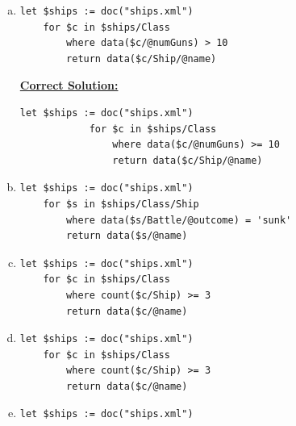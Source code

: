 \documentclass[12pt]{article}
\begin{document}
\begin{enumerate}[1.]
\begin{enumerate}[a)]
\begin{mdframed}
        \end{mdframed}

        \item

    \begin{lstlisting}[language=XML]
    let $ships := doc("ships.xml")
    for $c in $ships/Class
        where data($c/@numGuns) > 10
        return data($c/Ship/@name)
    \end{lstlisting}

        \begin{mdframed}
            \underline{\textbf{Correct Solution:}}

            \begin{lstlisting}[language=XML]
            let $ships := doc("ships.xml")
            for $c in $ships/Class
                where data($c/@numGuns) >= 10
                return data($c/Ship/@name)
            \end{lstlisting}

        \end{mdframed}

        \item

    \begin{lstlisting}[language=XML]
    let $ships := doc("ships.xml")
    for $s in $ships/Class/Ship
        where data($s/Battle/@outcome) = 'sunk'
        return data($s/@name)
    \end{lstlisting}
        \item

    \begin{lstlisting}[language=XML]
    let $ships := doc("ships.xml")
    for $c in $ships/Class
        where count($c/Ship) >= 3
        return data($c/@name)
    \end{lstlisting}

        \item

    \begin{lstlisting}[language=XML]
    let $ships := doc("ships.xml")
    for $c in $ships/Class
        where count($c/Ship) >= 3
        return data($c/@name)
    \end{lstlisting}

        \item

    \begin{lstlisting}[language=XML]
    let $ships := doc("ships.xml")
    \end{lstlisting}
    \end{enumerate}
\end{enumerate}
\end{document}
